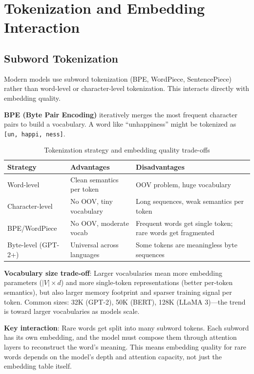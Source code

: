 \section{Tokenization and Embedding Interaction}
\label{sec:tokenization_embedding}

\subsection{Subword Tokenization}

Modern models use subword tokenization (BPE, WordPiece, SentencePiece) rather than word-level or character-level tokenization. This interacts directly with embedding quality.

\textbf{BPE (Byte Pair Encoding)} iteratively merges the most frequent character pairs to build a vocabulary. A word like ``unhappiness'' might be tokenized as \texttt{[un, happi, ness]}.

\begin{table}[H]
\centering
\caption{Tokenization strategy and embedding quality trade-offs}
\begin{tabularx}{\textwidth}{lXX}
\toprule
\textbf{Strategy} & \textbf{Advantages} & \textbf{Disadvantages} \\
\midrule
Word-level & Clean semantics per token & OOV problem, huge vocabulary \\
Character-level & No OOV, tiny vocabulary & Long sequences, weak semantics per token \\
BPE/WordPiece & No OOV, moderate vocab & Frequent words get single token; rare words get fragmented \\
Byte-level (GPT-2+) & Universal across languages & Some tokens are meaningless byte sequences \\
\bottomrule
\end{tabularx}
\end{table}

\textbf{Vocabulary size trade-off}: Larger vocabularies mean more embedding parameters ($|V| \times d$) and more single-token representations (better per-token semantics), but also larger memory footprint and sparser training signal per token. Common sizes: 32K (GPT-2), 50K (BERT), 128K (LLaMA 3)---the trend is toward larger vocabularies as models scale.

\textbf{Key interaction}: Rare words get split into many subword tokens. Each subword has its own embedding, and the model must compose them through attention layers to reconstruct the word's meaning. This means embedding quality for rare words depends on the model's depth and attention capacity, not just the embedding table itself.

